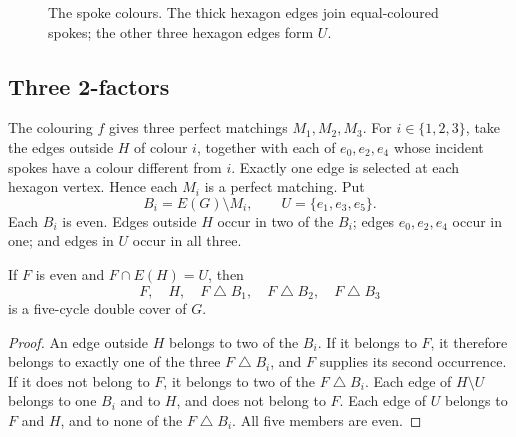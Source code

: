 \documentclass[justified,notoc,twoside,nobib,nofonts]{tufte-handout}
\newcommand{\sd}{\mathbin{\triangle}}
\begin{document}
\begin{figure}[htbp]
\centering
{}
\caption{The spoke colours. The thick hexagon edges join
equal-coloured spokes; the other three hexagon edges form $U$.}
\label{fig:hexagon}
\end{figure}
\FloatBarrier

\subsection{Three 2-factors}

The colouring $f$ gives three perfect matchings $M_1,M_2,M_3$.
For $i\in\{1,2,3\}$, take the edges outside $H$ of colour $i$, together
with each of $e_0,e_2,e_4$ whose incident spokes have a colour different
from $i$. Exactly one edge is selected at each hexagon vertex.
Hence each $M_i$ is a perfect matching.
Put
\[
  B_i=E(G)\setminus M_i,\qquad U=\{e_1,e_3,e_5\}.
\]
Each $B_i$ is even. Edges outside $H$ occur in two of the $B_i$;
edges $e_0,e_2,e_4$ occur in one; and edges in $U$ occur in all three.

\begin{lemma}\label{lem:alternating}
If $F$ is even and $F\cap E(H)=U$, then
\begin{equation}\label{eq:alternating}
  F,\quad H,\quad F\sd B_1,\quad F\sd B_2,\quad F\sd B_3
\end{equation}
is a five-cycle double cover of $G$.
\end{lemma}

\begin{proof}
An edge outside $H$ belongs to two of the $B_i$. If it belongs to
$F$, it therefore belongs to exactly one of the three $F\sd B_i$,
and $F$ supplies its second occurrence. If it does not belong to
$F$, it belongs to two of the $F\sd B_i$. Each edge of $H\setminus U$ belongs
to one $B_i$ and to $H$, and does not belong to $F$. Each edge of
$U$ belongs to $F$ and $H$, and to none of the $F\sd B_i$.
All five members are even.
\end{proof}
\end{document}
